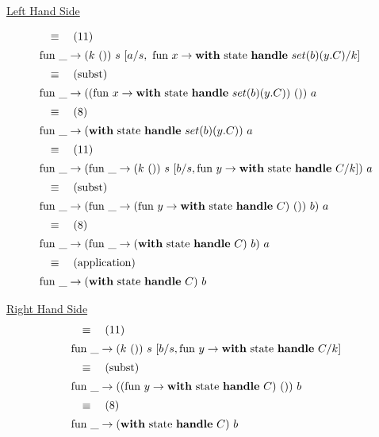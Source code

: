 \documentclass[logo,bsc,singlespacing,parskip]{infthesis}
\begin{document}
\underline{Left Hand Side}

\[ 
\begin{array}{l}
\quad\equiv\quad (11) \\[5pt]
\text{fun }\_ \rightarrow (k\ ())\ s\ [a/s,\ \text{fun } x \rightarrow \text{\textbf{with} state \textbf{handle} } set(b)(y.C)/k] \\[5pt]
\quad\equiv\quad (\text{subst}) \\[5pt]
\text{fun }\_ \rightarrow ((\text{fun } x \rightarrow \text{\textbf{with} state \textbf{handle} } set(b)(y.C))\ ())\ a \\[5pt]
\quad\equiv\quad (8) \\[5pt]
\text{fun }\_ \rightarrow (\text{\textbf{with} state \textbf{handle} } set(b)(y.C))\ a \\[5pt]
\quad\equiv\quad (11) \\[5pt]
\text{fun }\_ \rightarrow (\text{fun }\_ \rightarrow (k\ ())\ s\ [b/s, \text{fun } y \rightarrow \text{\textbf{with} state \textbf{handle} } C/k])\ a \\[5pt]
\quad\equiv\quad (\text{subst}) \\[5pt]
\text{fun }\_ \rightarrow (\text{fun }\_ \rightarrow (\text{fun } y \rightarrow \text{\textbf{with} state \textbf{handle} } C)\ ())\ b)\ a \\[5pt]
\quad\equiv\quad (8) \\[5pt]
\text{fun }\_ \rightarrow (\text{fun }\_ \rightarrow (\text{\textbf{with} state \textbf{handle} } C)\ b)\ a \\[5pt]
\quad\equiv\quad (\text{application}) \\[5pt]
\text{fun }\_ \rightarrow (\text{\textbf{with} state \textbf{handle} } C)\ b
\end{array}
\]

\underline{Right Hand Side}
\[ 
\begin{array}{l}
\quad\equiv\quad (11) \\[5pt]
\text{fun }\_ \rightarrow (k\ ())\ s\ [b/s, \text{fun } y \rightarrow \text{\textbf{with} state \textbf{handle} } C/k] \\[5pt]
\quad\equiv\quad (\text{subst}) \\[5pt]
\text{fun }\_ \rightarrow ((\text{fun } y \rightarrow \text{\textbf{with} state \textbf{handle} } C)\ ())\ b \\[5pt]
\quad\equiv\quad (8) \\[5pt]
\text{fun }\_ \rightarrow (\text{\textbf{with} state \textbf{handle} } C)\ b
\end{array}
\]
\end{document}
